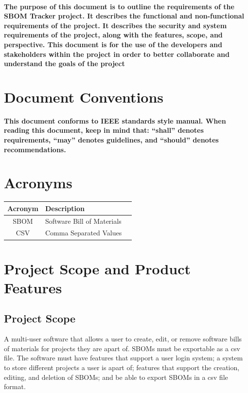 \documentclass[letterpaper,12pt,oneside,listof=totoc]{scrreprt}
\begin{document}
\paragraph{ \normalfont
The purpose of this document is to outline the requirements of the SBOM Tracker project. It
describes the functional and non-functional requirements of the project. It describes the security
and system requirements of the project, along with the features, scope, and perspective. This
document is for the use of the developers and stakeholders within the project in order to better
collaborate and understand the goals of the project
}

\section{Document Conventions}
\paragraph{ \normalfont
This document conforms to IEEE standards style manual. When reading this document, keep in
mind that: “shall” denotes requirements, “may” denotes guidelines, and “should” denotes
recommendations.
}

\section{Acronyms}
\begin{tabular}{| c | p{} | p{} |}
\hline
Acronym     & Description \\
\hline
SBOM & Software Bill of Materials \\
\hline
CSV & Comma Separated Values \\
\hline
\end{tabular}


\section{Project Scope and Product Features}

\subsection{Project Scope}
A multi-user software that allows a user to create, edit, or remove software bills of materials for projects they are apart of. SBOMs must be exportable as a csv file. The software must have features that support a user login system; a system to store different projects a user is apart of; features that support the creation, editing, and deletion of SBOMs; and be able to export SBOMs in a csv file format.
\end{document}

